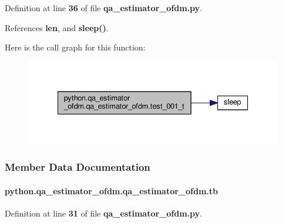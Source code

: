 Definition at line {\bf 36} of file {\bf qa\+\_\+estimator\+\_\+ofdm.\+py}.



References {\bf len}, and {\bf sleep()}.



Here is the call graph for this function\+:
\nopagebreak
\begin{figure}[H]
\begin{center}
\leavevmode
\includegraphics[width=335pt]{d9/df2/classpython_1_1qa__estimator__ofdm_1_1qa__estimator__ofdm_aea50da99c3ffeadd0dcb95d2b12a8106_cgraph}
\end{center}
\end{figure}




\subsubsection{Member Data Documentation}
\paragraph[{tb}]{\setlength{\rightskip}{0pt plus 5cm}python.\+qa\+\_\+estimator\+\_\+ofdm.\+qa\+\_\+estimator\+\_\+ofdm.\+tb}\label{classpython_1_1qa__estimator__ofdm_1_1qa__estimator__ofdm_ad4d1a9b11fd26986cd0d2887861b3c8a}


Definition at line {\bf 31} of file {\bf qa\+\_\+estimator\+\_\+ofdm.\+py}.



